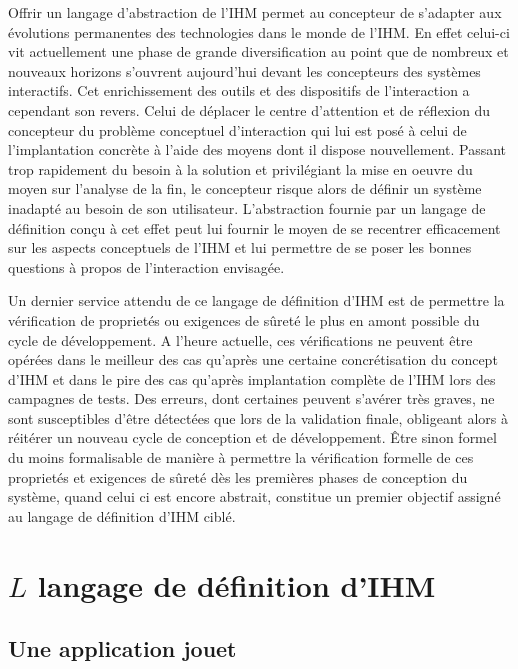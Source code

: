 \documentclass{ihm}
\begin{document}
Offrir  un langage  d'abstraction  de l'IHM  permet  au concepteur  de
s'adapter aux évolutions permanentes des technologies dans le monde de
l'IHM.   En  effet  celui-ci  vit actuellement  une  phase  de  grande
diversification  au  point  que   de  nombreux  et  nouveaux  horizons
s'ouvrent aujourd'hui devant les concepteurs des systèmes interactifs.
Cet enrichissement  des outils et  des dispositifs de  l'interaction a
cependant son revers.   Celui de déplacer le centre  d'attention et de
réflexion du  concepteur du problème conceptuel  d'interaction qui lui
est posé à  celui de l'implantation concrète à l'aide  des moyens dont
il  dispose  nouvellement. Passant  trop  rapidement  du besoin  à  la
solution et privilégiant  la mise en oeuvre du moyen  sur l'analyse de
la fin, le  concepteur risque alors de définir un  système inadapté au
besoin de  son utilisateur.  L'abstraction  fournie par un  langage de
définition conçu à cet effet peut lui fournir le moyen de se recentrer
efficacement sur les aspects conceptuels  de l'IHM et lui permettre de
se poser les bonnes questions à propos de l'interaction envisagée.

Un dernier  service attendu de ce  langage de définition d'IHM  est de
permettre la vérification de proprietés ou exigences de sûreté le plus
en amont possible  du cycle de développement. A  l'heure actuelle, ces
vérifications  ne  peuvent  être  opérées dans  le  meilleur  des  cas
qu'après une certaine concrétisation du  concept d'IHM et dans le pire
des cas qu'après implantation complète  de l'IHM lors des campagnes de
tests.  Des erreurs,  dont certaines peuvent s'avérer  très graves, ne
sont susceptibles d'être  détectées que lors de  la validation finale,
obligeant  alors à  réitérer  un  nouveau cycle  de  conception et  de
développement. Être sinon  formel du moins formalisable  de manière à
permettre la vérification  formelle de ces proprietés  et exigences de
sûreté dès les premières phases  de conception du système, quand celui
ci  est encore  abstrait,  constitue un  premier  objectif assigné  au
langage de définition d'IHM ciblé.

\section{$L$ langage de définition d'IHM} 

\subsection{Une application jouet}
\end{document}
